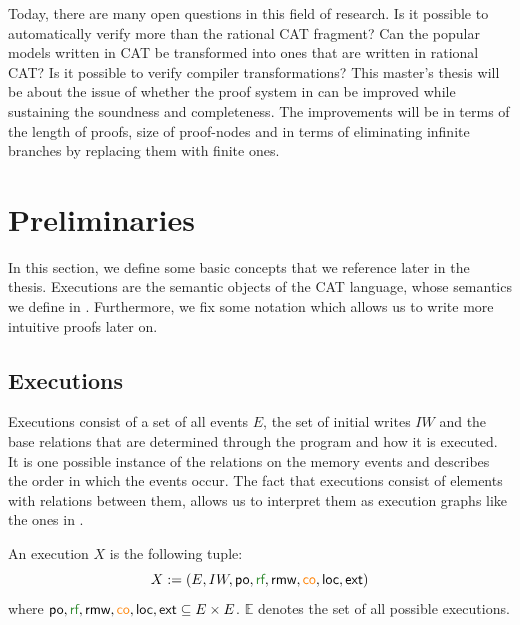 \documentclass[a4paper,twoside,12pt, english]{article}
\begin{document}
Today, there are many open questions in this field of research. Is it possible to automatically verify  more than the rational CAT fragment?
Can the popular models written in CAT be transformed into ones that are written in rational CAT?
Is it possible to verify compiler transformations?
This master's thesis will be about the issue of whether the proof system in \cite{Gru+26} can be improved while sustaining the soundness and completeness. The improvements will be in terms of the length of proofs, size of proof-nodes and in terms of eliminating infinite branches by replacing them with finite ones.

\pagebreak
\section{Preliminaries} \label{sec:preliminaries}
In this section, we define some basic concepts that we reference later in the thesis. Executions are the semantic objects of the CAT language, whose semantics we define in .
Furthermore, we fix some notation which allows us to write more intuitive proofs later on.

\subsection{Executions}
Executions consist of a set of all events $E$, the set of initial writes $IW$ and the base relations that are determined through the program and how it is executed. It is one possible instance of the relations on the memory events and describes the order in which the events occur. The fact that executions consist of elements with relations between them, allows us to interpret them as execution graphs like the ones in .
\begin{definition}[Execution]
An execution $X$ is the following tuple:
\[X := (E, IW, \po, \rf, \rmw, \co, \loc, \ext)\]  
where $\po, \rf, \rmw, \co, \loc, \ext \subseteq E \times E$.
$\mathbb{E}$ denotes the set of all possible executions. 
\end{definition}
\end{document}
